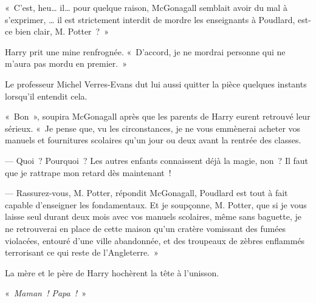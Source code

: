 «~C'est, heu… il… pour quelque raison, McGonagall semblait avoir du mal à s'exprimer, … il est strictement interdit de mordre les enseignants à Poudlard, est-ce bien clair, M. Potter~?~»

Harry prit une mine renfrognée. «~D'accord, je ne mordrai personne qui ne m'aura pas mordu en premier.~»

Le professeur Michel Verres-Evans dut lui aussi quitter la pièce quelques instants lorsqu'il entendit cela.

«~Bon~», soupira McGonagall après que les parents de Harry eurent retrouvé leur sérieux. «~Je pense que, vu les circonstances, je ne vous emmènerai acheter vos manuels et fournitures scolaires qu'un jour ou deux avant la rentrée des classes.

--- Quoi~? Pourquoi~? Les autres enfants connaissent déjà la magie, non~?  Il faut que je rattrape mon retard dès maintenant~!

--- Rassurez-vous, M. Potter, répondit McGonagall, Poudlard est tout à fait capable d'enseigner les fondamentaux. Et je soupçonne, M. Potter, que si je vous laisse seul durant deux mois avec vos manuels scolaires, même sans baguette, je ne retrouverai en place de cette maison qu'un cratère vomissant des fumées violacées, entouré d'une ville abandonnée, et des troupeaux de zèbres enflammés terrorisant ce qui reste de l'Angleterre.~»

La mère et le père de Harry hochèrent la tête à l'unisson.

«~\emph{Maman~! Papa~!}~»
